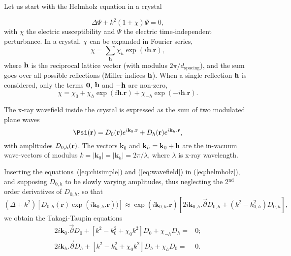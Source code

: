 \documentclass[preprint]{iucr}              %
\begin{document}
Let us start with the Helmholz equation in a crystal

\begin{equation}
\label{eq:helmholz}
    \Delta \Psi + k^2 (1+\chi) \Psi = 0,
\end{equation}
with $\chi$ the electric susceptibility and $\Psi$ the electric time-independent perturbance. In a crystal, $\chi$ can be expanded in Fourier series,
\begin{equation}
\label{eq:chi}
    \chi = \sum_{\textbf{h}} \chi_h \exp(i \textbf{h} . \textbf{r}),
\end{equation}
where $\bf{h}$ is the reciprocal lattice vector (with modulus $2\pi/d_\text{spacing}$), and the sum goes over all possible reflections (Miller indices $\bf{h}$). When a single reflection $\bf{h}$ is considered, only the terms $\bf{0}$, $\bf{h}$ and $\bf{-h}$ are non-zero, 
\begin{equation}
\label{eq:chisimple}
    \chi = \chi_0 + \chi_{h} \exp(i \textbf{h} . \textbf{r}) + \chi_{-h} \exp(-i \textbf{h} . \textbf{r}).
\end{equation}

The x-ray wavefield inside the crystal is expressed as the sum of two modulated plane waves
\begin{equation}
\label{eq:wavefield}
    \Psi(\textbf r) = D_0(\textbf r) e^{i \textbf k_0 . \textbf r} + D_h(\textbf r) e^{i \textbf k_h . \textbf r},
\end{equation}
with amplitudes $D_{0,h}(\textbf r)$.
The vectors $\textbf{k}_0$ and $\textbf k_h=\textbf k_0 + \textbf h$ are the in-vacuum wave-vectors of modulus $k=|\textbf{k}_0|=|\textbf{k}_h|=2\pi/\lambda$, where $\lambda$ is x-ray wavelength. 

Inserting the equations~(\ref{eq:chisimple}) and (\ref{eq:wavefield}) in (\ref{eq:helmholz}), and supposing $D_{0,h}$ to be slowly varying amplitudes, thus neglecting the 2$^{\text{nd}}$ order derivatives of $D_{0,h}$,  so that
\begin{equation}
\label{eq:approxslowlyvarying}
(\Delta + k^2)[D_{0,h}(\textbf{r}) \exp(i\textbf{k}_{0,h} . \textbf{r}))] \approx \exp(i\textbf{k}_{0,h} . \textbf{r}) [2 i \textbf{k}_{0,h} . \overset{\rightarrow} \partial D_{0,h} + (k^2 - k^2_{0,h}) D_{0,h}],
\end{equation}
we obtain the Takagi-Taupin equations
\begin{subequations}
\label{eq:TTvector}
\begin{align}
2 i \textbf{k}_0 . \overset{\rightarrow} \partial D_0 + [k^2 - k_0^2 + \chi_0 k^2] D_0 + \chi_{-h} D_h =& 0; \\
2 i \textbf{k}_h . \overset{\rightarrow} \partial D_h + [k^2 - k_h^2 + \chi_0 k^2] D_h + \chi_{h} D_0 =& 0.
\end{align}
\end{subequations}
\end{document}
